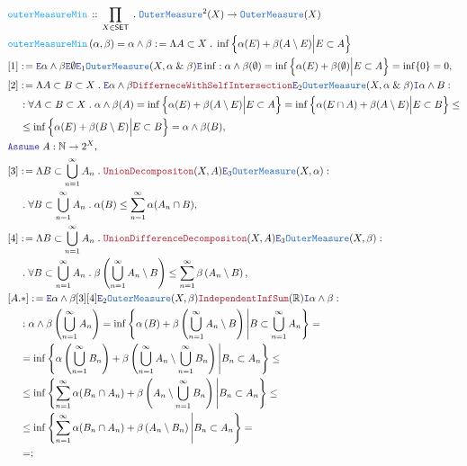 \documentclass[12pt]{scrartcl}
\newcommand{\TYPE}[1]{\textcolor{NavyBlue}{\mathtt{#1}}}
\newcommand{\FUNC}[1]{\textcolor{Cerulean}{\mathtt{#1}}}
\newcommand{\LOGIC}[1]{\textcolor{Blue}{\mathtt{#1}}}
\newcommand{\THM}[1]{\textcolor{Maroon}{\mathtt{#1}}}
\renewcommand{\.}{\; . \;}
\newcommand{\de}{: \kern 0.1pc =}
\newcommand{\Act}[1]{\left( #1 \right)}
\newcommand{\DeclareFunc}[2]{& \FUNC{#1} \, :: \, #2 \\}
\newcommand{\DefineNamedFunc}[4]{&  \FUNC{#1}\Act{#2} = #3 \de #4 \\}
\newcommand{\NewLine}{\\ & \kern 1pc}
\newcommand{\Page}[1]{ \begin{align*} #1 \end{align*}   }
\renewcommand{\And}{\; \& \;}
\newcommand{\Intro}{\LOGIC{I}}
\newcommand{\Elim}{\LOGIC{E}}
\newcommand{\Reals}{\mathbb{R} }
\newcommand{\Nat}{\mathbb{N} }
\newcommand{\Say}[3]{& #1 \de #2 : #3, \\}
\newcommand{\Conclude}[3]{& #1 \de #2 : #3; \\}
\newcommand{\Assume}[2]{& \LOGIC{Assume} \; #1 : #2, \\}
\newcommand{\SET}{\mathsf{SET}}
\newcommand{\OM}{\TYPE{OuterMeasure}}
\begin{document}
\Page{
	\DeclareFunc{outerMeasureMin}
	{
		\prod_{ X \in \SET } \.
		\OM^2(X) \to \OM(X)
	}
	\DefineNamedFunc{outerMeasureMin}{\alpha,\beta}{\alpha \wedge \beta}
	{
		\Lambda A \subset X \.
		\inf \Big\{ \alpha( E ) + \beta(A \setminus E) \Big|  E \subset A  \Big\}	
	}
	\Say{[1]}{\Elim \alpha \wedge \beta \Elim \emptyset \Elim_1 \OM(X,\alpha \And \beta) \Elim \inf}
	{
			\alpha \wedge \beta (\emptyset) =
			\inf  \Big\{ \alpha( E ) + \beta(\emptyset) \Big|  E \subset A  \Big\} =
			\inf \{ 0 \} = 0
	}
	\Say{[2]}{
		\Lambda A \subset B \subset X \.
		\Elim \alpha \wedge \beta 
		\THM{DifferneceWithSelfIntersection}
		\Elim_2 \OM(X,\alpha \And \beta)
		\Intro \alpha \wedge B
	}
	{
			\NewLine :
			\forall A \subset B \subset X \.			
			\alpha \wedge \beta (A) =
			\inf  \Big\{ \alpha( E ) + \beta(A \setminus E) \Big|  E \subset A  \Big\} =
			\inf  \Big\{ \alpha( E \cap A ) + \beta(A \setminus E) \Big|  E \subset B  \Big\}
			\le \NewLine \le
			\inf  \Big\{ \alpha( E ) + \beta(B \setminus E) \Big|  E \subset B  \Big\} =
			\alpha \wedge \beta(B)
	}
	\Assume{A}{\Nat \to 2^X}
	\Say{[3]}{
		\Lambda B \subset \bigcup^\infty_{n=1}	A_n \.
		\THM{UnionDecompositon}(X,A)
		\Elim_3 \OM(X,\alpha)
	}
	{
		\NewLine \.		
		\forall B \subset \bigcup^\infty_{n=1}	A_n \.
		\alpha(B) \le \sum^\infty_{n=1} \alpha(A_n \cap B) 
	}
	\Say{[4]}{
		\Lambda B \subset \bigcup^\infty_{n=1}	A_n \.
		\THM{UnionDifferenceDecompositon}(X,A)
		\Elim_3 \OM(X,\beta)
	}
	{	
		\NewLine \.		
		\forall B \subset \bigcup^\infty_{n=1}	A_n \.
		\beta\left(\bigcup^\infty_{n=1} A_n \setminus B\right) 
		\le \sum^\infty_{n=1} \beta\left(A_n \setminus B \right) 
	}
	\Conclude{[A.*]}{
		\Elim \alpha \wedge	\beta
		[3][4]
		\Elim_2 \OM(X,\beta)
		\THM{IndependentInfSum}(\Reals)
		\Intro \alpha \wedge \beta
	}
	{
		\NewLine :		
		\alpha \wedge \beta\left( \bigcup^\infty_{n=1} A_n \right) =
		\inf \left\{
			\alpha\left(  B \right) +
			\beta\left(  \bigcup^\infty_{n=1} A_n \setminus B \right)
		\Bigg|
			B \subset \bigcup^\infty_{n=1} A_n		
		\right\} 
		= \NewLine =
		\inf \left\{
			\alpha\left(  \bigcup^\infty_{n=1} B_n \right) +
			\beta\left(  \bigcup^\infty_{n=1} A_n \setminus \bigcup^\infty_{n=1} B_n  \right)
		\Bigg|
			B_n \subset  A_n		
		\right\}
		\le \NewLine \le
		\inf \left\{
			\sum^\infty_{n=1} \alpha( B_n \cap A_n ) +  
			\beta\left(A_n \setminus \bigcup^\infty_{n=1}B_n\right)
		\Bigg|
			B_n \subset A_n		
		\right\} 
		\le \NewLine \le 
		\inf \left\{
			\sum^\infty_{n=1} \alpha( B_n \cap A_n ) +  
			\beta\left(A_n \setminus B_n\right)
		\Bigg|
			B_n \subset A_n		
		\right\}
		= \NewLine =
}}
\end{document}
